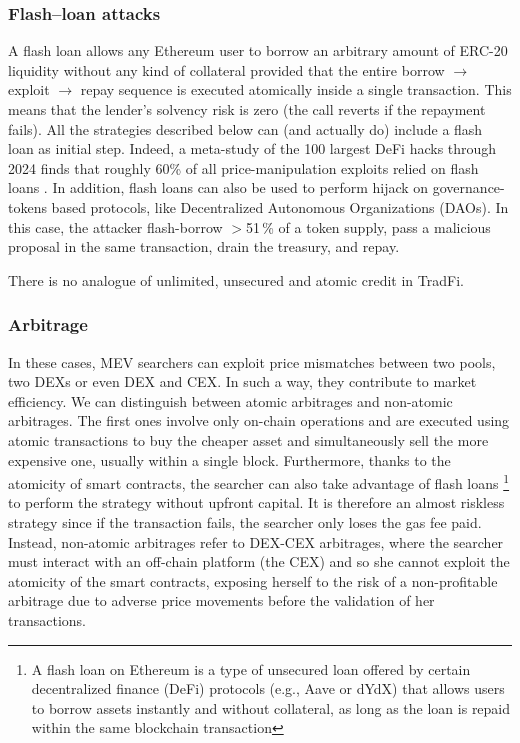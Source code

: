 \documentclass[a4paper,11pt]{article}
\begin{document}
\subsubsection{Flash--loan attacks}
\label{subsec:flashloans}

A flash loan allows any Ethereum user to borrow  an arbitrary amount of ERC-20 liquidity without any kind of collateral provided that the entire borrow $\rightarrow$ exploit $\rightarrow$ repay sequence is executed atomically inside a single transaction.  This means that the lender’s solvency risk is zero (the call reverts if the repayment fails). All the strategies described below can (and actually do) include a flash loan as initial step. Indeed, a meta-study of the 100 largest DeFi hacks through 2024 finds that roughly
60\% of all price-manipulation exploits relied on flash loans
\cite{halborn2024survey}. In addition, flash loans can also be used to perform hijack on governance-tokens based protocols, like Decentralized Autonomous Organizations (DAOs). In this case, the attacker flash-borrow $>$51\,\% of a token supply, pass a malicious proposal in the same transaction, drain the treasury, and repay.

There is no analogue of unlimited, unsecured and atomic credit in TradFi.

\subsubsection{Arbitrage}
In these cases, MEV searchers can exploit price mismatches between two pools, two DEXs or even DEX and CEX. In such a way, they contribute to market efficiency. We can distinguish between atomic arbitrages and non-atomic arbitrages. The first ones involve only on-chain operations and are executed using atomic transactions to buy the cheaper asset and simultaneously sell the more expensive one, usually within a single block. Furthermore, thanks to the atomicity of smart contracts, the searcher can also take advantage of flash loans \footnote{A flash loan on Ethereum is a type of unsecured loan offered by certain decentralized finance (DeFi) protocols (e.g., Aave or dYdX) that allows users to borrow assets instantly and without collateral, as long as the loan is repaid within the same blockchain transaction} to perform the strategy without upfront capital. It is therefore an almost riskless strategy since if the transaction fails, the searcher only loses the gas fee paid. Instead, non-atomic arbitrages refer to DEX-CEX arbitrages, where the searcher must interact with an off-chain platform (the CEX) and so she cannot exploit the atomicity of the smart contracts, exposing herself to the risk of a non-profitable arbitrage due to adverse price movements before the validation of her transactions.
\end{document}
